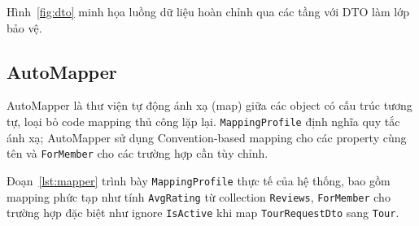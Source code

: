 Hình~\ref{fig:dto} minh họa luồng dữ liệu hoàn chỉnh qua
các tầng với DTO làm lớp bảo vệ.

\subsection{AutoMapper}\label{sub3.5.2}

\begin{de}\label{def3.9}
AutoMapper là thư viện tự động ánh xạ (map) giữa các object
có cấu trúc tương tự, loại bỏ code mapping thủ công lặp lại.
\texttt{MappingProfile} định nghĩa quy tắc ánh xạ; AutoMapper
sử dụng Convention-based mapping cho các property cùng tên và
\texttt{ForMember} cho các trường hợp cần tùy chỉnh.
\end{de}

Đoạn~\ref{lst:mapper} trình bày \texttt{MappingProfile} thực
tế của hệ thống, bao gồm mapping phức tạp như tính
\texttt{AvgRating} từ collection \texttt{Reviews},
\texttt{ForMember} cho trường hợp đặc biệt như ignore
\texttt{IsActive} khi map \texttt{TourRequestDto} sang
\texttt{Tour}.

